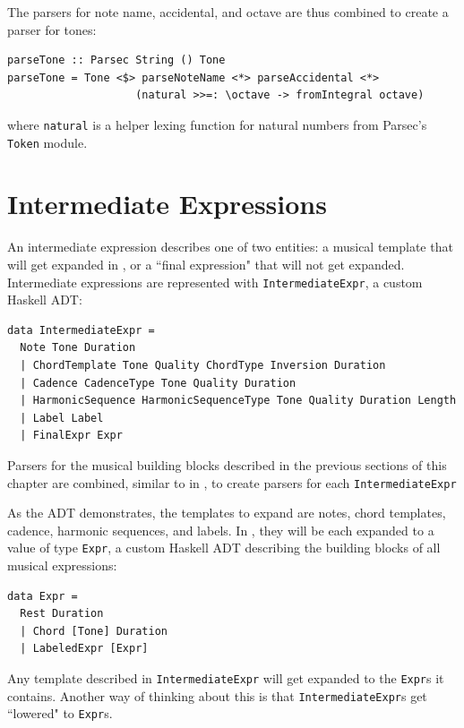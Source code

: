 \documentclass{report}
\begin{document}
The parsers for note name, accidental, and octave are thus combined to create a parser for tones:\newpage

\begin{verbatim}
parseTone :: Parsec String () Tone 
parseTone = Tone <$> parseNoteName <*> parseAccidental <*> 
		            (natural >>=: \octave -> fromIntegral octave)
\end{verbatim}
where \verb.natural. is a helper lexing function for natural numbers from Parsec's \verb.Token. module.

\section{Intermediate Expressions}

An intermediate expression describes one of two entities: a musical template that will get expanded in , or a ``final expression" that will not get expanded. Intermediate expressions are represented with \verb.IntermediateExpr., a custom Haskell ADT:

\begin{verbatim}
data IntermediateExpr = 
  Note Tone Duration
  | ChordTemplate Tone Quality ChordType Inversion Duration
  | Cadence CadenceType Tone Quality Duration
  | HarmonicSequence HarmonicSequenceType Tone Quality Duration Length 
  | Label Label
  | FinalExpr Expr
\end{verbatim}

Parsers for the musical building blocks described in the previous sections of this chapter are combined, similar to in , to create parsers for each \verb.IntermediateExpr.

As the ADT demonstrates, the templates to expand are notes, chord templates, cadence, harmonic sequences, and labels. In , they will be each expanded to a value of type \verb.Expr., a custom Haskell ADT describing the building blocks of all musical expressions:

\begin{verbatim}
data Expr = 
  Rest Duration
  | Chord [Tone] Duration
  | LabeledExpr [Expr]
\end{verbatim}

Any template described in \verb.IntermediateExpr. will get expanded to the \verb.Expr.s it contains. Another way of thinking about this is that \verb.IntermediateExpr.s get ``lowered" to \verb.Expr.s.
\end{document}
